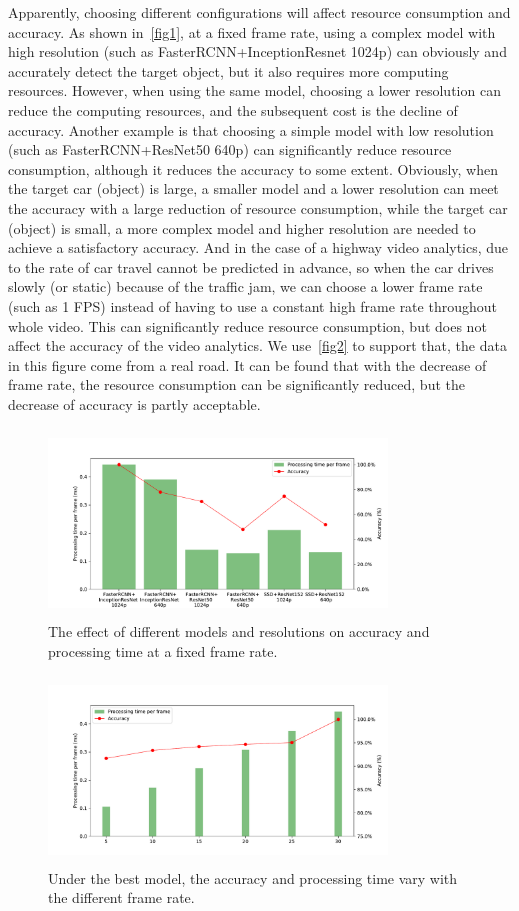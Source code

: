 Apparently, choosing different configurations will affect resource consumption and accuracy. As shown in~\autoref{fig1}, at a fixed frame rate, using a complex model with high resolution (such as FasterRCNN+InceptionResnet 1024p) can obviously and accurately detect the target object, but it also requires more computing resources. However, when using the same model, choosing a lower resolution can reduce the computing resources, and the subsequent cost is the decline of accuracy. Another example is that choosing a simple model with low resolution (such as FasterRCNN+ResNet50 640p) can significantly reduce resource consumption, although it reduces the accuracy to some extent. Obviously, when the target car (object) is large, a smaller model and a lower resolution can meet the accuracy with a large reduction of resource consumption, while the target car (object) is small, a more complex model and higher resolution are needed to achieve a satisfactory accuracy. And in the case of a highway video analytics, due to the rate of car travel cannot be predicted in advance, so when the car drives slowly (or static) because of the traffic jam, we can choose a lower frame rate (such as 1 FPS) instead of having to use a constant high frame rate throughout whole video. This can significantly reduce resource consumption, but does not affect the accuracy of the video analytics. We use~\autoref{fig2} to support that, the data in this figure come from a real road. It can be found that with the decrease of frame rate, the resource consumption can be significantly reduced, but the decrease of accuracy is partly acceptable.

\begin{figure}[h]
\includegraphics[width=9cm,height=5cm]{figures/figure1.pdf}
\centering
\caption{The effect of different models and resolutions on accuracy and processing time at a fixed frame rate.}
\label{fig1}
\end{figure}

\begin{figure}[h]
\includegraphics[width=9cm,height=5cm]{figures/figure2.pdf}
\centering
\caption{Under the best model, the accuracy and processing time vary with the different frame rate.}
\label{fig2}
\end{figure}


